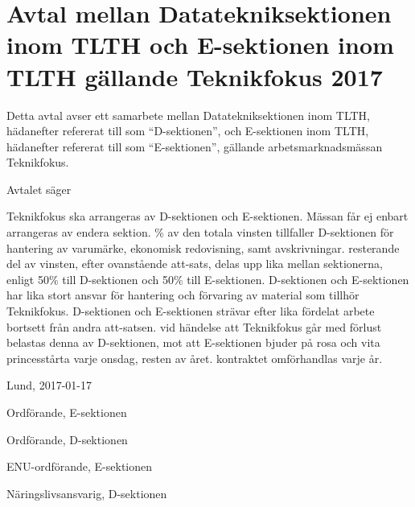 \documentclass[10pt]{article}
\def\tfdate{2017}
\def\doctitle{Avtal mellan Datatekniksektionen inom TLTH och E-sektionen inom TLTH gällande Teknikfokus {\tfdate}}
\def\date{2017-01-17} %
\begin{document}
    \section*{\doctitle}
    Detta avtal avser ett samarbete mellan Datatekniksektionen inom TLTH, hädanefter refererat till som ``D-sektionen'', och E-sektionen inom TLTH, hädanefter refererat till som ``E-sektionen'', gällande arbetsmarknadsmässan Teknikfokus.

    Avtalet säger
    \begin{attsatser}
        \att Teknikfokus ska arrangeras av D-sektionen och E-sektionen. Mässan får ej enbart arrangeras av endera sektion.
        \% av den totala vinsten tillfaller D-sektionen för hantering av varumärke, ekonomisk redovisning, samt avskrivningar.
        \att resterande del av vinsten, efter ovanstående att-sats, delas upp lika mellan sektionerna, enligt 50\% till D-sektionen och 50\% till E-sektionen.
        \att D-sektionen och E-sektionen har lika stort ansvar för hantering och förvaring av material som tillhör Teknikfokus.
        \att D-sektionen och E-sektionen strävar efter lika fördelat arbete bortsett från andra att-satsen.
        \att vid händelse att Teknikfokus går med förlust belastas denna av D-sektionen, mot att E-sektionen bjuder på rosa och vita princesstårta varje onsdag, resten av året.
        \att kontraktet omförhandlas varje år.
    \end{attsatser}

    \begin{signatures}{4}
        Lund, \date
        \signature{Erik Månsson}{Ordförande, E-sektionen}
        \signature{Axel Isberg}{Ordförande, D-sektionen}
        \signature{Josefine Sandström}{ENU-ordförande, E-sektionen}
        \signature{Rasmus Göransson}{Näringslivsansvarig, D-sektionen}
    \end{signatures}
\end{document}
